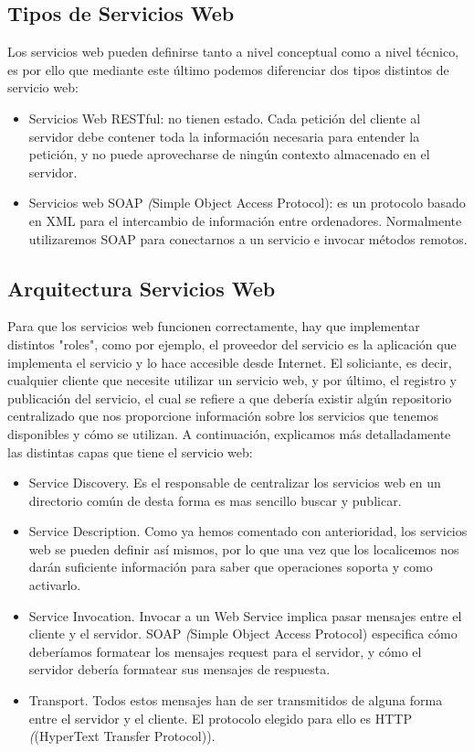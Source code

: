\subsection{Tipos de Servicios Web}
\label{cap:subsec:tiposserviciosweb}

Los servicios web pueden definirse tanto a nivel conceptual como a nivel técnico, es por ello que mediante este último podemos diferenciar dos tipos distintos de servicio web:
\begin{itemize}
	\item Servicios Web RESTful: no tienen estado. Cada petición del cliente al servidor debe contener toda la información necesaria para entender la petición, y no puede aprovecharse de ningún contexto almacenado en el servidor.
	\item Servicios web SOAP  \textit({Simple Object Access Protocol}): es un protocolo basado en XML para el intercambio de información entre ordenadores. Normalmente utilizaremos SOAP para conectarnos a un servicio e invocar métodos remotos.
\end{itemize}

\subsection{Arquitectura Servicios Web}
\label{cap:subsec:arquitecturaserviciosweb}
Para que los servicios web funcionen correctamente, hay que implementar distintos "roles", como por ejemplo, el proveedor del servicio es
la aplicación que implementa el servicio y lo hace accesible desde Internet. El soliciante, es decir, cualquier cliente que necesite
utilizar un servicio web, y por último, el registro y publicación del servicio, el cual se refiere a que debería existir algún
repositorio centralizado que nos proporcione información sobre los servicios que tenemos disponibles y cómo se utilizan. A continuación,
explicamos más detalladamente las distintas capas que tiene el servicio web:
\begin{itemize}
 \item Service Discovery. Es el responsable de centralizar los servicios web en un directorio común de desta forma es mas sencillo buscar y publicar.
 \item Service Description. Como ya hemos comentado con anterioridad, los servicios web se pueden definir así mismos, por lo que una vez que los localicemos nos darán suficiente información para saber que operaciones soporta y como activarlo.
 \item Service Invocation. Invocar a un Web Service implica pasar mensajes entre el cliente y el servidor. SOAP  \textit({Simple Object Access Protocol}) especifica cómo deberíamos formatear los mensajes request para el servidor, y cómo el servidor debería formatear sus mensajes de respuesta.
 \item Transport. Todos estos mensajes han de ser transmitidos de alguna forma entre el servidor y el cliente. El protocolo elegido para ello es HTTP  \textit({(HyperText Transfer Protocol)}). 
\end{itemize}

